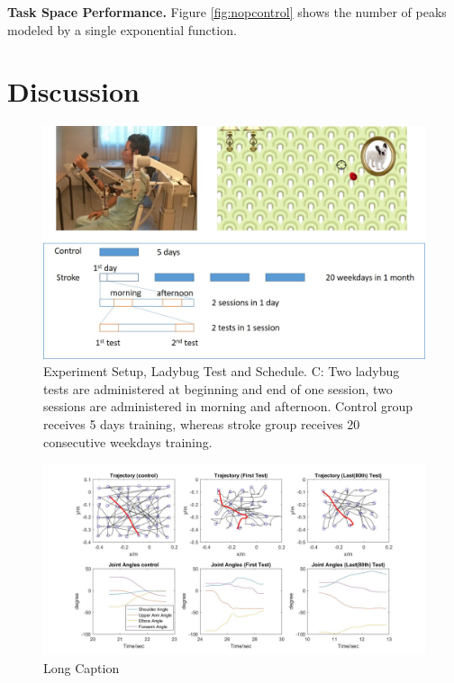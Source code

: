 \textbf{Task Space Performance.}
Figure \ref{fig:nopcontrol} shows the number of peaks modeled by a single exponential function.

\section{Discussion}



\begin{figure}
	\centering
	\includegraphics[width=1\linewidth]{figures/1setup&schedule}
	\caption[Experiment Setup and Schedule]{Experiment Setup, Ladybug Test and Schedule. C: Two ladybug tests are administered at beginning and end of one session, two sessions are administered in morning and afternoon. Control group receives 5 days training, whereas stroke group receives 20 consecutive weekdays training.}
	\label{fig:1setupschedule}
\end{figure}

\begin{figure}
	\centering
	\includegraphics[width=1\linewidth]{figures/2strokeTrajExamp}
	\caption[Short Caption]{Long Caption}
	\label{fig:2stroketrajexamp}
\end{figure}


